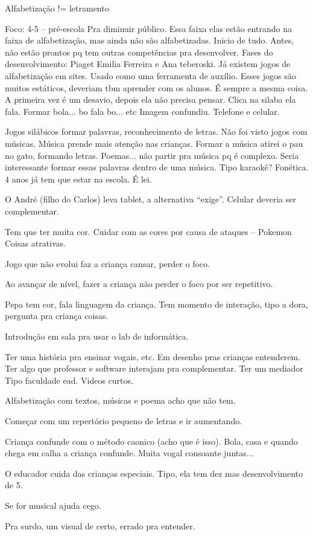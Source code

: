 \documentclass{sigchi}
\begin{document}
Alfabetização != letramento

Foco: 4-5 – pré-escola
Pra diminuir público. Essa faixa elas estão entrando na faixa de alfabetização, mas ainda não são alfabetizadas. Inicio de tudo. Antes, não estão prontos pq tem outras competências pra desenvolver.
Fases do desenvolvimento: Piaget
Emilia Ferreira e Ana teberoski.
Já existem jogos de alfabetização em sites. Usado como uma ferramenta de auxílio. Esses jogos são muitos estáticos, deveriam tbm aprender com os alunos.
É sempre a mesma coisa. A primeira vez é um desavio, depois ela não precisa pensar.
Clica na silaba ela fala. Formar bola... bo fala bo... etc
Imagem confundiu. Telefone e celular.

Jogos silábicos formar palavras, reconhecimento de letras. Não foi visto jogos com músicas. 
Música prende mais atenção nas crianças.
Formar a música atirei o pau no gato, formando letras. Poemas... não partir pra música pq é complexo.
Seria interessante formar essas palavras dentro de uma música. Tipo karaokê?
Fonética.
4 anos já tem que estar na escola. É lei.

O André (filho do Carlos) leva tablet, a alternativa “exige”. Celular deveria ser complementar.

Tem que ter muita cor. Cuidar com as cores por causa de ataques – Pokemon
Coisas atrativas. 

Jogo que não evolui faz a criança cansar, perder o foco.

Ao avançar de nível, fazer a criança não perder o foco por ser repetitivo.

Pepa tem cor, fala linguagem da criança. Tem momento de interação, tipo a dora, pergunta pra criança coisas.

Introdução em sala pra usar o lab de informática.

Ter uma história pra ensinar vogais, etc. Em desenho pras crianças entenderem. Ter algo que professor e software interajam pra complementar. Ter um mediador
Tipo faculdade ead. Videos curtos.

Alfabetização com textos, músicas e poema acho que não tem.

Começar com um repertório pequeno de letras e ir aumentando.

Criança confunde com o método caonico (acho que é isso). Bola, casa e quando chega em calha a criança confunde. Muita vogal consoante juntas...

O educador cuida das crianças especiais. Tipo, ela tem dez mas desenvolvimento de 5.

Se for musical ajuda cego.

Pra surdo, um visual de certo, errado pra entender.

\balance{}



\end{document}
